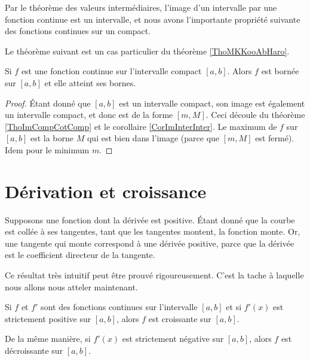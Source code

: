 Par le théorème des valeurs intermédiaires, l'image d'un intervalle par une fonction continue est un intervalle, et nous avons l'importante propriété suivante des fonctions continues sur un compact.

Le théorème suivant est un cas particulier du théorème \ref{ThoMKKooAbHaro}.
\begin{theorem}
    Si $f$ est une fonction continue sur l'intervalle compact $[a,b]$. Alors $f$ est bornée sur $[a,b]$ et elle atteint ses bornes.
\end{theorem}

\begin{proof}
    Étant donné que $[a,b]$ est un intervalle compact, son image est également un intervalle compact, et donc est de la forme $[m,M]$. Ceci découle du théorème \ref{ThoImCompCotComp} et le corollaire \ref{CorImInterInter}. Le maximum de $f$ sur $[a,b]$ est la borne $M$ qui est bien dans l'image (parce que $[m,M]$ est fermé). Idem pour le minimum $m$.
\end{proof}

\section{Dérivation et croissance}

Supposons une fonction dont la dérivée est positive. Étant donné que la courbe est \og collée \fg{} à ses tangentes, tant que les tangentes montent, la fonction monte. Or, une tangente qui monte correspond à une dérivée positive, parce que la dérivée est le coefficient directeur de la tangente.

Ce résultat très intuitif peut être prouvé rigoureusement. C'est la tache à laquelle nous allons nous atteler maintenant.

\begin{proposition} \label{PropGFkZMwD}
    Si $f$ et $f'$ sont des fonctions continues sur l'intervalle $[a,b]$ et si $f'(x)$ est strictement positive sur $[a,b]$, alors $f$ est croissante sur $[a,b]$.

    De la même manière, si $f'(x)$ est strictement négative sur $[a,b]$, alors $f$ est décroissante sur $[a,b]$.
\end{proposition}

